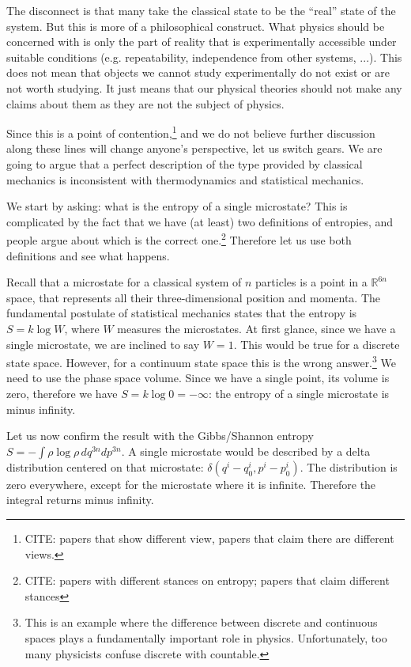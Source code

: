 \documentclass[10pt,twocolumn, nofootinbib]{revtex4-2}
\begin{document}
The disconnect is that many take the classical state to be the ``real'' state of the system. But this is more of a philosophical construct. What physics should be concerned with is only the part of reality that is experimentally accessible under suitable conditions (e.g. repeatability, independence from other systems, ...). This does not mean that objects we cannot study experimentally do not exist or are not worth studying. It just means that our physical theories should not make any claims about them as they are not the subject of physics.

Since this is a point of contention,\footnote{CITE: papers that show different view, papers that claim there are different views.} and we do not believe further discussion along these lines will change anyone's perspective, let us switch gears. We are going to argue that a perfect description of the type provided by classical mechanics is inconsistent with thermodynamics and statistical mechanics.

We start by asking: what is the entropy of a single microstate? This is complicated by the fact that we have (at least) two definitions of entropies, and people argue about which is the correct one.\footnote{CITE: papers with different stances on entropy; papers that claim different stances} Therefore let us use both definitions and see what happens.

Recall that a microstate for a classical system of $n$ particles is a point in a $\mathbb{R}^{6n}$ space, that represents all their three-dimensional position and momenta. The fundamental postulate of statistical mechanics states that the entropy is $S = k \log W$, where $W$ measures the  microstates. At first glance, since we have a single microstate, we are inclined to say $W = 1$. This would be true for a discrete state space. However, for a continuum state space this is the wrong answer.\footnote{This is an example where the difference between discrete and continuous spaces plays a fundamentally important role in physics. Unfortunately, too many physicists confuse discrete with countable.} We need to use the phase space volume. Since we have a single point, its volume is zero, therefore we have $S = k \log 0 = -\infty$: the entropy of a single microstate is minus infinity.

Let us now confirm the result with the Gibbs/Shannon entropy $S = -\int \rho \log \rho \, dq^{3n} dp^{3n}$. A single microstate would be described by a delta distribution centered on that microstate: $\delta(q^i-q^i_0, p^i-p^i_0)$. The distribution is zero everywhere, except for the microstate where it is infinite. Therefore the integral returns minus infinity.
\end{document}
